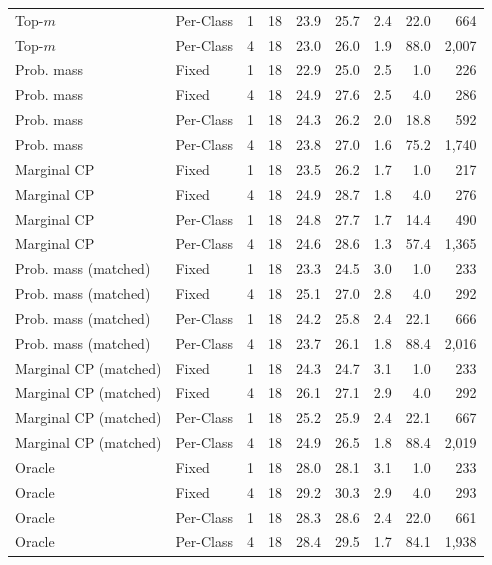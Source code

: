 \begin{tabular}{llrrrrrrr}
Top-$m$ & Per-Class & 1 & 18 & 23.9 & 25.7 & 2.4 & 22.0 & 664 \\
Top-$m$ & Per-Class & 4 & 18 & 23.0 & 26.0 & 1.9 & 88.0 & 2,007 \\
Prob. mass & Fixed & 1 & 18 & 22.9 & 25.0 & 2.5 & 1.0 & 226 \\
Prob. mass & Fixed & 4 & 18 & 24.9 & 27.6 & 2.5 & 4.0 & 286 \\
Prob. mass & Per-Class & 1 & 18 & 24.3 & 26.2 & 2.0 & 18.8 & 592 \\
Prob. mass & Per-Class & 4 & 18 & 23.8 & 27.0 & 1.6 & 75.2 & 1,740 \\
Marginal CP & Fixed & 1 & 18 & 23.5 & 26.2 & 1.7 & 1.0 & 217 \\
Marginal CP & Fixed & 4 & 18 & 24.9 & 28.7 & 1.8 & 4.0 & 276 \\
Marginal CP & Per-Class & 1 & 18 & 24.8 & 27.7 & 1.7 & 14.4 & 490 \\
Marginal CP & Per-Class & 4 & 18 & 24.6 & 28.6 & 1.3 & 57.4 & 1,365 \\
Prob. mass (matched) & Fixed & 1 & 18 & 23.3 & 24.5 & 3.0 & 1.0 & 233 \\
Prob. mass (matched) & Fixed & 4 & 18 & 25.1 & 27.0 & 2.8 & 4.0 & 292 \\
Prob. mass (matched) & Per-Class & 1 & 18 & 24.2 & 25.8 & 2.4 & 22.1 & 666 \\
Prob. mass (matched) & Per-Class & 4 & 18 & 23.7 & 26.1 & 1.8 & 88.4 & 2,016 \\
Marginal CP (matched) & Fixed & 1 & 18 & 24.3 & 24.7 & 3.1 & 1.0 & 233 \\
Marginal CP (matched) & Fixed & 4 & 18 & 26.1 & 27.1 & 2.9 & 4.0 & 292 \\
Marginal CP (matched) & Per-Class & 1 & 18 & 25.2 & 25.9 & 2.4 & 22.1 & 667 \\
Marginal CP (matched) & Per-Class & 4 & 18 & 24.9 & 26.5 & 1.8 & 88.4 & 2,019 \\
Oracle & Fixed & 1 & 18 & 28.0 & 28.1 & 3.1 & 1.0 & 233 \\
Oracle & Fixed & 4 & 18 & 29.2 & 30.3 & 2.9 & 4.0 & 293 \\
Oracle & Per-Class & 1 & 18 & 28.3 & 28.6 & 2.4 & 22.0 & 661 \\
Oracle & Per-Class & 4 & 18 & 28.4 & 29.5 & 1.7 & 84.1 & 1,938 \\
\bottomrule
\end{tabular}
